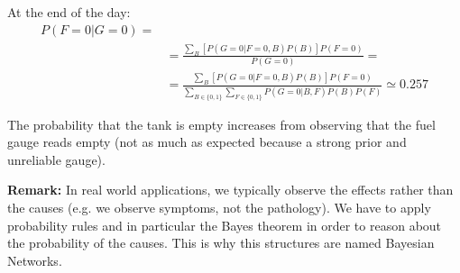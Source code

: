 \begin{itemize}
		At the end of the day:
		\begin{align*}
			P(F=0 | G=0) = \\
			              & =\frac{\sum_{B}[P(G=0 | F=0, B) P(B)] P(F=0)}{P(G=0)}=                                                                   \\
			              & =\frac{\sum_{B}[P(G=0 | F=0, B) P(B)] P(F=0)}{\sum_{B \in \{0,1\}}\sum_{F \in \{0,1\}}P(G=0 | B, F)P(B)P(F)}\simeq 0.257
		\end{align*}
\end{itemize}

The probability that the tank is empty increases from observing that the fuel gauge
reads empty (not as much as expected because a strong prior and unreliable gauge).
\newline

\textbf{Remark:} In real world applications, we typically observe the effects rather
than the causes (e.g. we observe symptoms, not the pathology). We have to apply
probability rules and in particular the Bayes theorem in order to reason about
the probability of the causes. This is why this structures are named Bayesian Networks.
\newline

